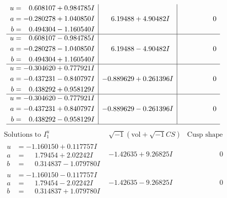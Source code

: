 \documentclass[1p]{elsarticle_modified}
\theoremstyle{definition}
\newcommand{\I}{\sqrt{-1}}
\begin{document}
$$\begin{array}{c|c|c}
\begin{aligned}
u &= \phantom{-}0.608107 + 0.984785 I \\
a &= -0.280278 + 1.040850 I \\
b &= \phantom{-}0.494304 - 1.160540 I\end{aligned}
 & \phantom{-}6.19488 + 4.90482 I & \phantom{-0.000000 } 0 \\ \hline\begin{aligned}
u &= \phantom{-}0.608107 - 0.984785 I \\
a &= -0.280278 - 1.040850 I \\
b &= \phantom{-}0.494304 + 1.160540 I\end{aligned}
 & \phantom{-}6.19488 - 4.90482 I & \phantom{-0.000000 } 0 \\ \hline\begin{aligned}
u &= -0.304620 + 0.777921 I \\
a &= -0.437231 - 0.840797 I \\
b &= \phantom{-}0.438292 + 0.958129 I\end{aligned}
 & -0.889629 + 0.261396 I & \phantom{-0.000000 } 0 \\ \hline\begin{aligned}
u &= -0.304620 - 0.777921 I \\
a &= -0.437231 + 0.840797 I \\
b &= \phantom{-}0.438292 - 0.958129 I\end{aligned}
 & -0.889629 - 0.261396 I & \phantom{-0.000000 } 0\\
 \hline 
 \end{array}$$\newpage$$\begin{array}{c|c|c}  
\text{Solutions to }I^u_{1}& \I (\text{vol} + \sqrt{-1}CS) & \text{Cusp shape}\\
 \hline 
\begin{aligned}
u &= -1.160150 + 0.117757 I \\
a &= \phantom{-}1.79454 + 2.02242 I \\
b &= \phantom{-}0.314837 - 1.079780 I\end{aligned}
 & -1.42635 + 9.26825 I & \phantom{-0.000000 } 0 \\ \hline\begin{aligned}
u &= -1.160150 - 0.117757 I \\
a &= \phantom{-}1.79454 - 2.02242 I \\
b &= \phantom{-}0.314837 + 1.079780 I\end{aligned}
 & -1.42635 - 9.26825 I & \phantom{-0.000000 } 0 \\ \hline\begin{aligned}

\end{aligned}
\end{array}$$
\end{document}
